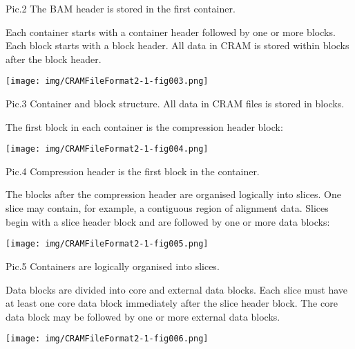 \documentclass[a4paper]{article}
\begin{document}
Pic.2 The BAM header is stored in the first container.

Each container starts with a container header followed by one or more blocks. Each 
block starts with a block header. All data in CRAM is stored within blocks after 
the block header.

\texttt{[image: img/CRAMFileFormat2-1-fig003.png]}

Pic.3 Container and block structure. All data in CRAM files is stored in blocks.

The first block in each container is the compression header block:

\texttt{[image: img/CRAMFileFormat2-1-fig004.png]}

Pic.4 Compression header is the first block in the container.

The blocks after the compression header are organised logically into slices. One 
slice may contain, for example, a contiguous region of alignment data. Slices begin 
with a slice header block and are followed by one or more data blocks:

\texttt{[image: img/CRAMFileFormat2-1-fig005.png]}

Pic.5 Containers are logically organised into slices.

Data blocks are divided into core and external data blocks. Each slice must have 
at least one core data block immediately after the slice header block. The core 
data block may be followed by one or more external data blocks.

\texttt{[image: img/CRAMFileFormat2-1-fig006.png]}
\end{document}

